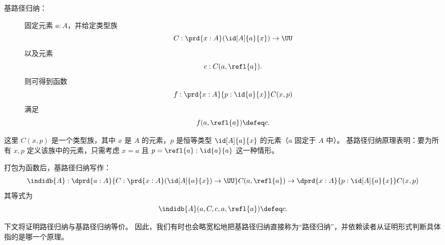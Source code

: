 %
%
\begin{description}
\item[基路径归纳：] 
  固定元素 $a:A$，并给定类型族
  \[ C : \prd{x:A} (\id[A]{a}{x}) \to \UU \]
  以及元素
  \[ c : C(a,\refl{a}). \]
  则可得到函数
  \[ f : \prd{x:A}{p:\id{a}{x}} C(x,p) \]
  满足
  \[ f(a,\refl{a}) \defeq c.\]
\end{description}

这里 $C(x,p)$ 是一个类型族，其中 $x$ 是 $A$ 的元素，$p$ 是恒等类型 $\id[A]{a}{x}$ 的元素（$a$ 固定于 $A$ 中）。
基路径归纳原理表明：要为所有 $x,p$ 定义该族中的元素，只需考虑 $x=a$ 且 $p=\refl{a} : \id{a}{a}$ 这一种情形。

打包为函数后，基路径归纳写作：
%
\begin{align*}
  \indidb{A} :  \dprd{a:A}{C : \prd{x:A} (\id[A]{a}{x}) \to \UU}
  C(a,\refl{a}) \to \dprd{x:A}{p : \id[A]{a}{x}} C(x,p) 
\end{align*}
其等式为
\[ \indidb{A}(a,C,c,a,\refl{a}) \defeq c. \]

下文将证明路径归纳与基路径归纳等价。
因此，我们有时也会略宽松地把基路径归纳直接称为“路径归纳”，并依赖读者从证明形式判断具体指的是哪一个原理。

